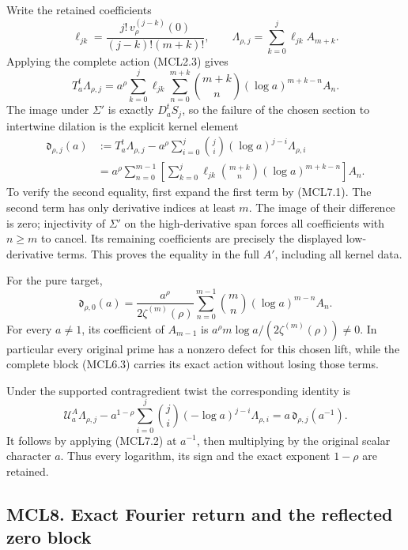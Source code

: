 Write the retained coefficients \[
 \ell_{jk}
 =\frac{j!\,v_\rho^{(j-k)}(0)}
       {(j-k)!(m+k)!},\qquad
 \Lambda_{\rho,j}=\sum_{k=0}^j\ell_{jk}A_{m+k}.
\] Applying the complete action (MCL2.3) gives \[
 T_a^t\Lambda_{\rho,j}
 =a^\rho\sum_{k=0}^j\ell_{jk}
       \sum_{n=0}^{m+k}\binom{m+k}{n}
       (\log a)^{m+k-n}A_n.
 \tag{MCL7.1}
\] The image under \(\Sigma'\) is exactly \(D_a^tS_j\), so the failure
of the chosen section to intertwine dilation is the explicit kernel
element \[
 \boxed{
 \begin{aligned}
 \mathfrak d_{\rho,j}(a)
 &:=
 T_a^t\Lambda_{\rho,j}
 -a^\rho\sum_{i=0}^j\binom ji(\log a)^{j-i}
       \Lambda_{\rho,i}\\
 &=a^\rho\sum_{n=0}^{m-1}
   \left[
    \sum_{k=0}^j\ell_{jk}\binom{m+k}{n}
       (\log a)^{m+k-n}
   \right]A_n.
 \end{aligned}
 }
 \tag{MCL7.2}
\] To verify the second equality, first expand the first term by
(MCL7.1). The second term has only derivative indices at least \(m\).
The image of their difference is zero; injectivity of \(\Sigma'\) on the
high-derivative span forces all coefficients with \(n\ge m\) to cancel.
Its remaining coefficients are precisely the displayed low-derivative
terms. This proves the equality in the full \(A'\), including all kernel
data.

For the pure target, \[
 \boxed{
 \mathfrak d_{\rho,0}(a)
 =\frac{a^\rho}{2\zeta^{(m)}(\rho)}
 \sum_{n=0}^{m-1}\binom mn(\log a)^{m-n}A_n .
 }
 \tag{MCL7.3}
\] For every \(a\ne1\), its coefficient of \(A_{m-1}\) is
\(a^\rho m\log a/(2\zeta^{(m)}(\rho))\ne0\). In particular every
original prime has a nonzero defect for this chosen lift, while the
complete block (MCL6.3) carries its exact action without losing those
terms.

Under the supported contragredient twist the corresponding identity is
\[
 \boxed{
 \mathcal U_a^A\Lambda_{\rho,j}
 -a^{1-\rho}\sum_{i=0}^j\binom ji(-\log a)^{j-i}
       \Lambda_{\rho,i}
 =a\,\mathfrak d_{\rho,j}(a^{-1}).
 }
 \tag{MCL7.4}
\] It follows by applying (MCL7.2) at \(a^{-1}\), then multiplying by
the original scalar character \(a\). Thus every logarithm, its sign and
the exact exponent \(1-\rho\) are retained.

\subsection{MCL8. Exact Fourier return and the reflected zero
block}\label{mcl8.-exact-fourier-return-and-the-reflected-zero-block}

